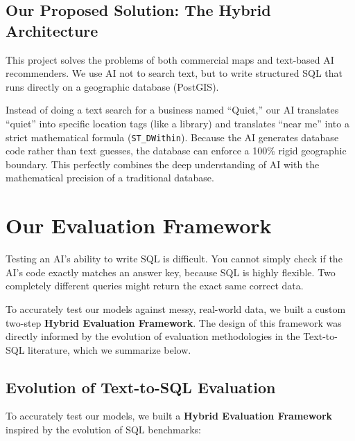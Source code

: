 \documentclass[11pt,a4paper]{article}
\begin{document}
\subsection{Our Proposed Solution: The Hybrid Architecture}

This project solves the problems of both commercial maps and text-based AI recommenders. We use AI not to search text, but to write structured SQL that runs directly on a geographic database (PostGIS).

Instead of doing a text search for a business named ``Quiet,'' our AI translates ``quiet'' into specific location tags (like a library) and translates ``near me'' into a strict mathematical formula (\texttt{ST\_DWithin}). Because the AI generates database code rather than text guesses, the database can enforce a 100\% rigid geographic boundary. This perfectly combines the deep understanding of AI with the mathematical precision of a traditional database.

\section{Our Evaluation Framework}

Testing an AI's ability to write SQL is difficult. You cannot simply check if the AI's code exactly matches an answer key, because SQL is highly flexible. Two completely different queries might return the exact same correct data.

To accurately test our models against messy, real-world data, we built a custom two-step \textbf{Hybrid Evaluation Framework}. The design of this framework was directly informed by the evolution of evaluation methodologies in the Text-to-SQL literature, which we summarize below.

\subsection{Evolution of Text-to-SQL Evaluation}

To accurately test our models, we built a \textbf{Hybrid Evaluation Framework} inspired by the evolution of SQL benchmarks:
\end{document}
